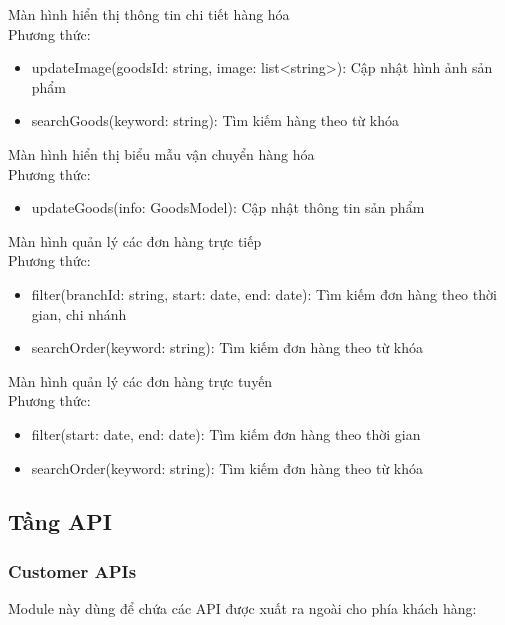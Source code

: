 Màn hình hiển thị thông tin chi tiết hàng hóa\\ 
Phương thức:
\begin{itemize}
	\item updateImage(goodsId: string, image: list<string>): Cập nhật hình ảnh sản phẩm
	\item searchGoods(keyword: string): Tìm kiếm hàng theo từ khóa
\end{itemize}

Màn hình hiển thị biểu mẫu vận chuyển hàng hóa\\ 
Phương thức:
\begin{itemize}
	\item updateGoods(info: GoodsModel): Cập nhật thông tin sản phẩm
\end{itemize}

Màn hình quản lý các đơn hàng trực tiếp\\ 
Phương thức:
\begin{itemize}
	\item filter(branchId: string, start: date, end: date): Tìm kiếm đơn hàng theo thời gian, chi nhánh
	\item searchOrder(keyword: string): Tìm kiếm đơn hàng theo từ khóa
\end{itemize}

Màn hình quản lý các đơn hàng trực tuyến\\ 
Phương thức:
\begin{itemize}
	\item filter(start: date, end: date): Tìm kiếm đơn hàng theo thời gian
	\item searchOrder(keyword: string): Tìm kiếm đơn hàng theo từ khóa
\end{itemize}



\subsection{Tầng API}
\subsubsection{Customer APIs}
Module này dùng để chứa các API được xuất ra ngoài cho phía khách hàng:

